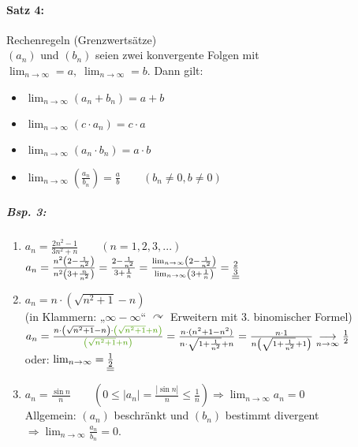 \paragraph{Satz 4:} Rechenregeln (Grenzwertsätze)\\
$(a_n)$ und $(b_n)$ seien zwei konvergente Folgen mit $\lim_{n\to \infty}=a, \; \lim_{n\to \infty} = b$. Dann gilt:
\begin{itemize}
\item $\lim_{n\to \infty}(a_n+b_n)=a+b$
\item $\lim_{n\to \infty}(c\cdot a_n)=c \cdot a$
\item $\lim_{n\to\infty} (a_n \cdot b_n) = a \cdot b$
\item $\lim_{n \to \infty} \left(\frac{a_n}{b_n}\right) = \frac{a}{b} \qquad (b_n\not = 0, b\not = 0)$
\end{itemize}
\subparagraph{Bsp. 3:}
\begin{enumerate} [label=\alph*.)]
\item $a_n=\frac{2n^2-1}{3n^2+n} \qquad (n=1,2,3,...)$\\
$a_n=\frac{n^2\left(2-\frac{1}{n^2}\right)}{n^2\left(3+\frac{n}{n^2}\right)}=\frac{2-\frac{1}{n^2}}{3+\frac{1}{n}}=\frac{\lim_{n\to\infty}\left(2-\frac{1}{n^2}\right)}{\lim_{n\to\infty}\left(3+\frac{1}{n}\right)}=\underline{\underline{\frac{2}{3}}}$\\
\item $a_n=n\cdot \left(\sqrt{n^2+1}-n\right)$ \\
(in Klammern: „$\infty-\infty$“ $\curvearrowright$ Erweitern mit 3. binomischer Formel)\\
$a_n=\frac{n\cdot \left( \sqrt{n^2+1}-n\right) \cdot \tgreen{\left(\sqrt{n^2+1}+n\right)}}{\tgreen{\left(\sqrt{n^2+1}+n\right)}}
=\frac{n\cdot (n^2+1-n^2)}{n\cdot \sqrt{1+\frac{1}{n^2}}+n}
=\frac{n\cdot 1 }{n\left(\sqrt{1+\frac{1}{n^2}}+1\right)}
\underset{n\to \infty}{\longrightarrow} \frac{1}{2}$ \\
oder:
$\lim_{n\to\infty} = \underline{\underline{\frac{ 1}{2}}}$
\item $a_n=\frac{\sin n}{n} \qquad \left(0\leq |a_n|=\frac{|\sin n|}{n}\leq \frac{1}{n}\right)\Rightarrow\lim_{n\to\infty}a_n=0$\bigskip\\
Allgemein: $(a_n)$ beschränkt und $(b_n)$ bestimmt divergent $\Rightarrow\lim_{n\to\infty}\frac{a_n}{b_n}=0$.
\end{enumerate}

